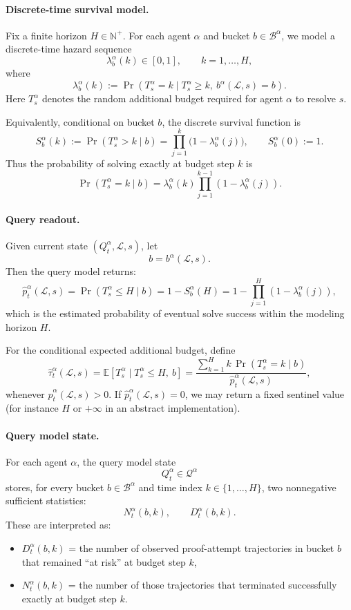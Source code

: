 \documentclass[letterpaper]{article} %
\begin{document}
\paragraph{Discrete-time survival model.}
Fix a finite horizon $H\in\mathbb N^+$. For each agent $\alpha$ and bucket $b\in\mathcal B^\alpha$, we model a discrete-time hazard sequence
\[
\lambda^\alpha_b(k)\in[0,1], \qquad k=1,\dots,H,
\]
where
\[
\lambda^\alpha_b(k)
:=
\Pr(T^\alpha_s = k \mid T^\alpha_s \ge k,\ b^\alpha(\mathcal L,s)=b).
\]
Here $T^\alpha_s$ denotes the random additional budget required for agent $\alpha$ to resolve $s$.

Equivalently, conditional on bucket $b$, the discrete survival function is
\[
S^\alpha_b(k)
:=
\Pr(T^\alpha_s > k \mid b)
=
\prod_{j=1}^{k}\big(1-\lambda^\alpha_b(j)\big),
\qquad S^\alpha_b(0):=1.
\]
Thus the probability of solving exactly at budget step $k$ is
\[
\Pr(T^\alpha_s = k \mid b)
=
\lambda^\alpha_b(k)\prod_{j=1}^{k-1}(1-\lambda^\alpha_b(j)).
\]

\paragraph{Query readout.}
Given current state $(Q^\alpha_t,\mathcal L,s)$, let
\[
b=b^\alpha(\mathcal L,s).
\]
Then the query model returns:
\[
\hat p^\alpha_t(\mathcal L,s)
=
\Pr(T^\alpha_s \le H \mid b)
=
1-S^\alpha_b(H)
=
1-\prod_{j=1}^{H}(1-\lambda^\alpha_b(j)),
\]
which is the estimated probability of eventual solve success within the modeling horizon $H$.

For the conditional expected additional budget, define
\[
\hat\tau^\alpha_t(\mathcal L,s)
=
\mathbb E[T^\alpha_s \mid T^\alpha_s \le H,\ b]
=
\frac{\sum_{k=1}^{H} k\,\Pr(T^\alpha_s = k \mid b)}
{\hat p^\alpha_t(\mathcal L,s)},
\]
whenever $\hat p^\alpha_t(\mathcal L,s)>0$. If $\hat p^\alpha_t(\mathcal L,s)=0$, we may return a fixed sentinel value (for instance $H$ or $+\infty$ in an abstract implementation).

\paragraph{Query model state.}
For each agent $\alpha$, the query model state
\[
Q^\alpha_t \in \mathcal Q^\alpha
\]
stores, for every bucket $b\in\mathcal B^\alpha$ and time index $k\in\{1,\dots,H\}$, two nonnegative sufficient statistics:
\[
N^\alpha_{t}(b,k),\qquad D^\alpha_{t}(b,k).
\]
These are interpreted as:
\begin{itemize}
    \item $D^\alpha_t(b,k)$ = the number of observed proof-attempt trajectories in bucket $b$ that remained ``at risk'' at budget step $k$,
    \item $N^\alpha_t(b,k)$ = the number of those trajectories that terminated successfully exactly at budget step $k$.
\end{itemize}
\end{document}
